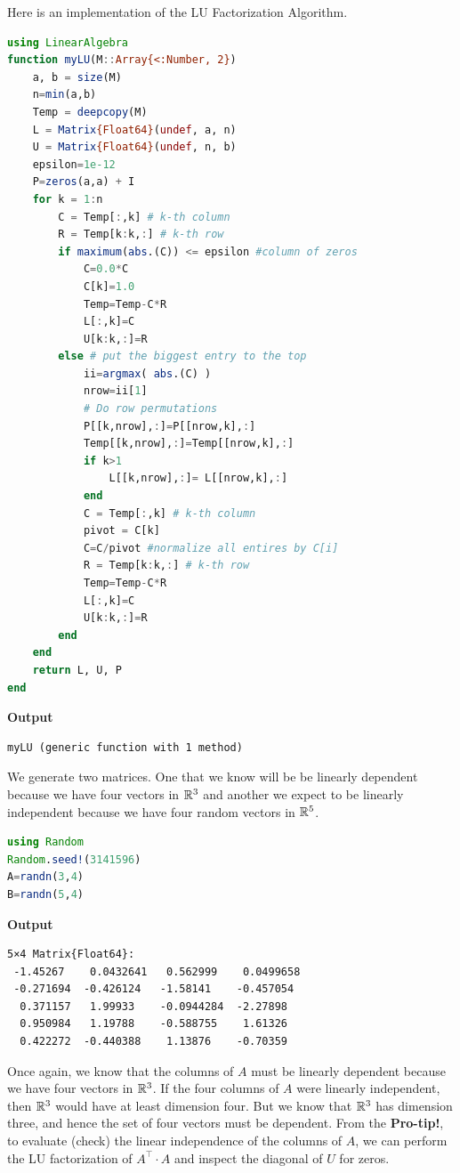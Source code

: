 \vspace*{.2cm}

Here is an implementation of the LU Factorization Algorithm. \\

\begin{lstlisting}[language=Julia,style=mystyle]
using LinearAlgebra
function myLU(M::Array{<:Number, 2})
    a, b = size(M)
    n=min(a,b)
    Temp = deepcopy(M)
    L = Matrix{Float64}(undef, a, n)
    U = Matrix{Float64}(undef, n, b)
    epsilon=1e-12
    P=zeros(a,a) + I
    for k = 1:n
        C = Temp[:,k] # k-th column
        R = Temp[k:k,:] # k-th row
        if maximum(abs.(C)) <= epsilon #column of zeros
            C=0.0*C
            C[k]=1.0
            Temp=Temp-C*R
            L[:,k]=C
            U[k:k,:]=R  
        else # put the biggest entry to the top
            ii=argmax( abs.(C) )
            nrow=ii[1] 
            # Do row permutations
            P[[k,nrow],:]=P[[nrow,k],:]
            Temp[[k,nrow],:]=Temp[[nrow,k],:]
            if k>1
                L[[k,nrow],:]= L[[nrow,k],:]
            end
            C = Temp[:,k] # k-th column
            pivot = C[k]
            C=C/pivot #normalize all entires by C[i]
            R = Temp[k:k,:] # k-th row
            Temp=Temp-C*R
            L[:,k]=C
            U[k:k,:]=R
        end
    end         
    return L, U, P
end
\end{lstlisting}
\textbf{Output} 
\begin{verbatim}
myLU (generic function with 1 method)
\end{verbatim}

We generate two matrices. One that we know will be be linearly dependent because we have four vectors in $\mathbb R^3$ and another we expect to be linearly independent because we have four random vectors in $\mathbb R^5$.\\

\begin{lstlisting}[language=Julia,style=mystyle]
using Random
Random.seed!(3141596)
A=randn(3,4)
B=randn(5,4)
\end{lstlisting}
\textbf{Output} 
\begin{verbatim}
5×4 Matrix{Float64}:
 -1.45267    0.0432641   0.562999    0.0499658
 -0.271694  -0.426124   -1.58141    -0.457054
  0.371157   1.99933    -0.0944284  -2.27898
  0.950984   1.19788    -0.588755    1.61326
  0.422272  -0.440388    1.13876    -0.70359
\end{verbatim}
Once again, we know that the columns of $A$ must be linearly dependent because we have four vectors in $\mathbb R^3$. If the four columns of $A$ were linearly independent, then $\mathbb R^3$ would have at least dimension four. But we know that $\mathbb R^3$ has dimension three, and hence the set of four vectors must be dependent. From the \textbf{Pro-tip!}, to evaluate (check) the linear independence of the columns of $A$, we can perform the LU factorization of $A^\top \cdot A$ and inspect the diagonal of $U$ for zeros.\\ 


